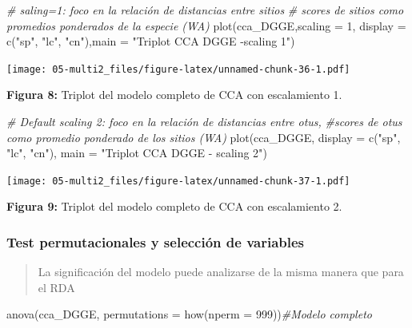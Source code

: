 \documentclass[
]{book}
\newenvironment{Shaded}{\begin{snugshade}}{\end{snugshade}}
\newcommand{\AttributeTok}[1]{\textcolor[rgb]{0.77,0.63,0.00}{#1}}
\newcommand{\CommentTok}[1]{\textcolor[rgb]{0.56,0.35,0.01}{\textit{#1}}}
\newcommand{\DecValTok}[1]{\textcolor[rgb]{0.00,0.00,0.81}{#1}}
\newcommand{\FunctionTok}[1]{\textcolor[rgb]{0.00,0.00,0.00}{#1}}
\newcommand{\NormalTok}[1]{#1}
\newcommand{\StringTok}[1]{\textcolor[rgb]{0.31,0.60,0.02}{#1}}
\begin{document}
\begin{Shaded}
\begin{Highlighting}[]
\CommentTok{\# saling=1: foco en la relación de distancias entre sitios}
\CommentTok{\# scores de sitios como promedios ponderados de la especie (WA)}
\FunctionTok{plot}\NormalTok{(cca\_DGGE,}\AttributeTok{scaling =} \DecValTok{1}\NormalTok{, }\AttributeTok{display =} \FunctionTok{c}\NormalTok{(}\StringTok{"sp"}\NormalTok{, }\StringTok{"lc"}\NormalTok{, }\StringTok{"cn"}\NormalTok{),}\AttributeTok{main =} \StringTok{"Triplot CCA DGGE {-}scaling 1"}\NormalTok{)}
\end{Highlighting}
\end{Shaded}

\texttt{[image: 05-multi2\_files/figure-latex/unnamed-chunk-36-1.pdf]}

\textbf{Figura 8:} Triplot del modelo completo de CCA con escalamiento 1.

\begin{Shaded}
\begin{Highlighting}[]
\CommentTok{\# Default scaling 2: foco en la relación de distancias entre otu\textquotesingle{}s, }
\CommentTok{\#scores de otu\textquotesingle{}s como promedio ponderado de los sitios (WA)}
\FunctionTok{plot}\NormalTok{(cca\_DGGE, }\AttributeTok{display =} \FunctionTok{c}\NormalTok{(}\StringTok{"sp"}\NormalTok{, }\StringTok{"lc"}\NormalTok{, }\StringTok{"cn"}\NormalTok{), }\AttributeTok{main =} \StringTok{"Triplot CCA DGGE {-} scaling 2"}\NormalTok{)}
\end{Highlighting}
\end{Shaded}

\texttt{[image: 05-multi2\_files/figure-latex/unnamed-chunk-37-1.pdf]}

\textbf{Figura 9:} Triplot del modelo completo de CCA con escalamiento 2.

\hypertarget{test-permutacionales-y-selecciuxf3n-de-variables}{%
\subsubsection{Test permutacionales y selección de variables}\label{test-permutacionales-y-selecciuxf3n-de-variables}}

\begin{quote}
La significación del modelo puede analizarse de la misma manera que para el RDA
\end{quote}

\begin{Shaded}
\begin{Highlighting}[]
\FunctionTok{anova}\NormalTok{(cca\_DGGE, }\AttributeTok{permutations =} \FunctionTok{how}\NormalTok{(}\AttributeTok{nperm =} \DecValTok{999}\NormalTok{))}\CommentTok{\#Modelo completo}
\end{Highlighting}
\end{Shaded}
\end{document}
